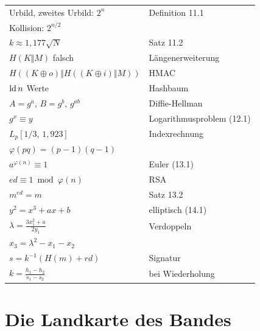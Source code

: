 \begin{merksatz}
\begin{center}
{\small
\renewcommand{\arraystretch}{1.62}
\begin{tabular}{@{}P{4.4cm}P{4.2cm}@{}}
\toprule
Urbild, zweites Urbild: $2^{n}$ & Definition 11.1\\
Kollision: $2^{n/2}$ & \\
$k \approx 1{,}177\sqrt N$ & Satz 11.2\\
$H(K\Vert M)$ \textcolor{akzent}{falsch} & Längenerweiterung\\
$H((K\oplus o)\Vert H((K\oplus i)\Vert M))$ & HMAC\\
$\operatorname{ld} n$ Werte & Hashbaum\\
\midrule
$A = g^{a}$, $B = g^{b}$, $g^{ab}$ & Diffie-Hellman\\
$g^{x} \equiv y$ & Logarithmusproblem (12.1)\\
$L_p[1/3,\,1{,}923]$ & Indexrechnung\\
$\varphi(pq) = (p-1)(q-1)$ & \\
$a^{\varphi(n)}\equiv1$ & Euler (13.1)\\
$ed \equiv 1 \bmod \varphi(n)$ & RSA\\
$m^{ed} = m$ & Satz 13.2\\
$y^2 = x^3+ax+b$ & elliptisch (14.1)\\
$\lambda = \frac{3x_1^2+a}{2y_1}$ & Verdoppeln\\
$x_3 = \lambda^2-x_1-x_2$ & \\
$s = k^{-1}(H(m)+rd)$ & Signatur\\
$k = \frac{h_1-h_2}{s_1-s_2}$ & \textcolor{akzent}{bei Wiederholung}\\
\bottomrule
\end{tabular}}
\end{center}
\end{merksatz}

\section{Die Landkarte des Bandes}

